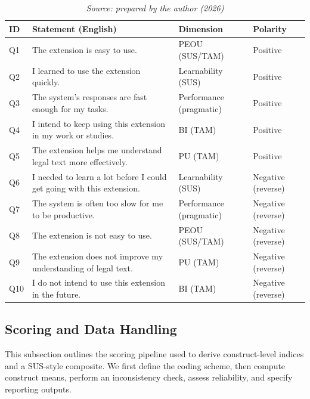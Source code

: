 \documentclass[english]{UNISINOSartigo} %
\newcommand{\floatsource}[1]{\caption*{\footnotesize\textit{Source: #1}}}
\newcommand{\tablesource}[1]{\floatsource{#1}}
\begin{document}
\begin{table}[H]\centering
\caption{Survey items, translated from Portuguese (negative items are reverse‐scored).}
\label{tab:survey-items}
\setlength{\tabcolsep}{4pt}
\renewcommand{\arraystretch}{1.12}
\footnotesize
\begin{tabularx}{\textwidth}{@{}l X l l@{}}
\toprule
\textbf{ID} & \textbf{Statement (English)} & \textbf{Dimension} & \textbf{Polarity} \\
\midrule
Q1  & The extension is easy to use. & PEOU (SUS/TAM) & Positive \\
Q2  & I learned to use the extension quickly. & Learnability (SUS) & Positive \\
Q3  & The system’s responses are fast enough for my tasks. & Performance (pragmatic) & Positive \\
Q4  & I intend to keep using this extension in my work or studies. & BI (TAM) & Positive \\
Q5  & The extension helps me understand legal text more effectively. & PU (TAM) & Positive \\
Q6  & I needed to learn a lot before I could get going with this extension. & Learnability (SUS) & Negative (reverse) \\
Q7  & The system is often too slow for me to be productive. & Performance (pragmatic) & Negative (reverse) \\
Q8  & The extension is not easy to use. & PEOU (SUS/TAM) & Negative (reverse) \\
Q9  & The extension does not improve my understanding of legal text. & PU (TAM) & Negative (reverse) \\
Q10 & I do not intend to use this extension in the future. & BI (TAM) & Negative (reverse) \\
\bottomrule
\end{tabularx}
\tablesource{prepared by the author (2026)}
\end{table}

\subsection{Scoring and Data Handling}

This subsection outlines the scoring pipeline used to derive construct-level indices and a SUS-style composite. We first define the coding scheme, then compute construct means, perform an inconsistency check, assess reliability, and specify reporting outputs.
\end{document}
